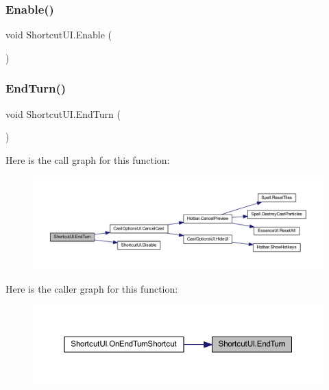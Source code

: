 \subsubsection{\texorpdfstring{Enable()}{Enable()}}
{\footnotesize\ttfamily void Shortcut\+U\+I.\+Enable (\begin{DoxyParamCaption}{ }\end{DoxyParamCaption})}

\mbox{\label{class_shortcut_u_i_ab2181e3a43736c065ce2ff0d8066903e}} 
\subsubsection{\texorpdfstring{EndTurn()}{EndTurn()}}
{\footnotesize\ttfamily void Shortcut\+U\+I.\+End\+Turn (\begin{DoxyParamCaption}{ }\end{DoxyParamCaption})}

Here is the call graph for this function\+:\nopagebreak
\begin{figure}[H]
\begin{center}
\leavevmode
\includegraphics[width=350pt]{class_shortcut_u_i_ab2181e3a43736c065ce2ff0d8066903e_cgraph}
\end{center}
\end{figure}
Here is the caller graph for this function\+:\nopagebreak
\begin{figure}[H]
\begin{center}
\leavevmode
\includegraphics[width=350pt]{class_shortcut_u_i_ab2181e3a43736c065ce2ff0d8066903e_icgraph}
\end{center}
\end{figure}
\mbox{\label{class_shortcut_u_i_a2434bf0b041a115161fda12022d69f0b}} 

